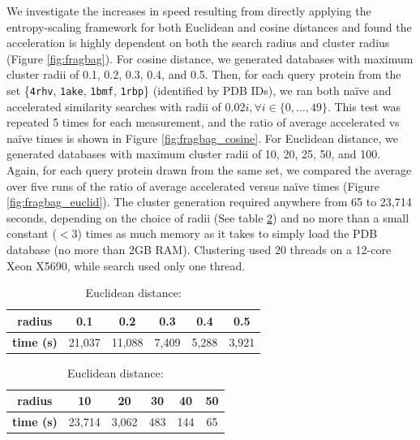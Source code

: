 \documentclass[review,preprint,12pt]{elsarticle}
\theoremstyle{definition}
\theoremstyle{remark}
\numberwithin{equation}{section}
\begin{document}
We investigate the increases in speed resulting from directly applying the entropy-scaling framework for both Euclidean and cosine distances and found the acceleration is highly dependent on both the search radius and cluster radius (Figure \ref{fig:fragbag}).
For cosine distance, we generated databases with maximum cluster radii of 0.1, 0.2, 0.3, 0.4, and 0.5.
Then, for each query protein from the set \{\texttt{4rhv}, \texttt{1ake}, \texttt{1bmf}, \texttt{1rbp}\} (identified by PDB IDs), we ran both na\"ive and accelerated similarity searches with radii of $0.02i, \forall i \in \{0,\ldots,49\}$.
This test was repeated 5 times for each measurement, and the ratio of average accelerated vs na\"ive times is shown in Figure \ref{fig:fragbag_cosine}.
For Euclidean distance, we generated databases with maximum cluster radii of 10, 20, 25, 50, and 100.
Again, for each query protein drawn from the same set, we compared the average over five runs of the ratio of average accelerated versus na\"ive times (Figure \ref{fig:fragbag_euclid}).
The cluster generation required anywhere from 65 to 23,714 seconds, depending on the choice of radii (See table \ref{tab:esfragbag_clustering}) and no more than a small constant ($<3$) times as much memory as it takes to simply load the PDB database (no more than 2GB RAM).
Clustering used 20 threads on a 12-core Xeon X5690, while search used only one thread.
\begin{table}
\caption{Cluster generation time for esFragBag}
\label{tab:esfragbag_clustering}
\begin{subtable}{1\textwidth}
    \centering
\caption{Cosine distance:}
\begin{tabular}{c|ccccc}
\hline
\textbf{radius} & 0.1 & 0.2 & 0.3 & 0.4 &  0.5 \\
\hline
\textbf{time (s)} & 21,037 & 11,088 & 7,409 & 5,288 & 3,921 \\
\hline
\end{tabular}
\end{subtable}

\vspace{1em}
\begin{subtable}{1\textwidth}
    \centering
\caption{Euclidean distance:}
\begin{tabular}{c|ccccc}
\hline
\textbf{radius} & 10 & 20 & 30 & 40 & 50 \\
\hline
\textbf{time (s)} & 23,714 & 3,062 & 483 & 144 & 65 \\
\hline
\end{tabular}
\end{subtable}
\end{table}
\end{document}
